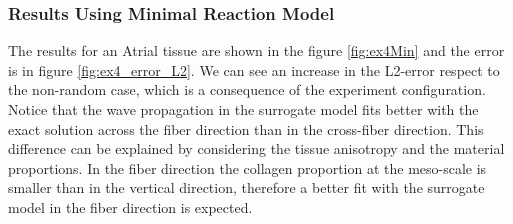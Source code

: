 \subsubsection{Results Using Minimal Reaction Model}

The results for an Atrial tissue are shown in the figure \ref{fig:ex4Min} and the error is in figure \ref{fig:ex4_error_L2}. We can see an increase in the L2-error respect to the non-random case, which is a consequence of the experiment configuration. Notice that the wave propagation in the surrogate model fits better with the exact solution across the fiber direction than in the cross-fiber direction. This difference can be explained by considering the tissue anisotropy and the material proportions. In the fiber direction the collagen proportion at the meso-scale is smaller than in the vertical direction, therefore a better fit with the surrogate model in the fiber direction is expected.



